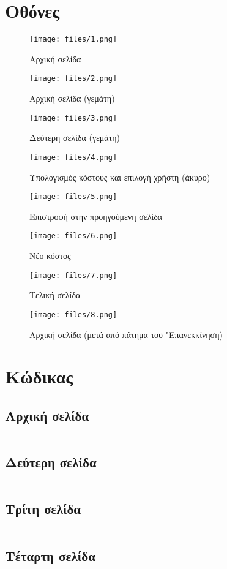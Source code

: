 \documentclass[a4paper,9pt]{article}
\begin{document}
\def\thesection {\arabic{section}}




\section{Οθόνες}
\begin{figure}[H]
    \centering
    \texttt{[image: files/1.png]}
    \caption{Αρχική σελίδα}
\end{figure}
\begin{figure}[H]
    \centering
    \texttt{[image: files/2.png]}
    \caption{Αρχική σελίδα (γεμάτη)}
\end{figure}
\begin{figure}[H]
    \centering
    \texttt{[image: files/3.png]}
    \caption{Δεύτερη σελίδα (γεμάτη)}
\end{figure}
\begin{figure}[H]
    \centering
    \texttt{[image: files/4.png]}
    \caption{Υπολογισμός κόστους και επιλογή χρήστη  (άκυρο)}
\end{figure}
\begin{figure}[H]
    \centering
    \texttt{[image: files/5.png]}
    \caption{Επιστροφή στην προηγούμενη σελίδα}
\end{figure}
\begin{figure}[H]
    \centering
    \texttt{[image: files/6.png]}
    \caption{Νέο κόστος}
\end{figure}
\begin{figure}[H]
    \centering
    \texttt{[image: files/7.png]}
    \caption{Τελική σελίδα}
\end{figure}
\begin{figure}[H]
    \centering
    \texttt{[image: files/8.png]}
    \caption{Αρχική σελίδα (μετά από πάτημα του "Επανεκκίνηση)}
\end{figure}

\pagebreak


\section{Κώδικας}
\subsection{Αρχική σελίδα}
\inputminted[linenos,fontsize=\scriptsize]{html}{files/index.html}
\subsection{Δεύτερη σελίδα}
\inputminted[linenos,fontsize=\scriptsize]{jsp}{files/continent.jsp}
\subsection{Τρίτη σελίδα}
\inputminted[linenos,fontsize=\scriptsize]{jsp}{files/booking.jsp}
\subsection{Τέταρτη σελίδα}
\inputminted[linenos,fontsize=\scriptsize]{jsp}{files/final.jsp}
\end{document}
